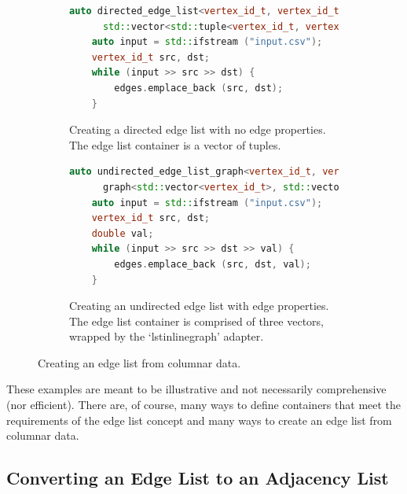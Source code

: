 \begin{figure}[ht]
  \begin{center}
    \begin{subfigure}{0.48\textwidth}
      \begin{lstlisting}[language=C++]
    auto directed_edge_list<vertex_id_t, vertex_id_t>
      std::vector<std::tuple<vertex_id_t, vertex_id_t> edges;
    auto input = std::ifstream ("input.csv");
    vertex_id_t src, dst;
    while (input >> src >> dst) {
        edges.emplace_back (src, dst);
    }
      \end{lstlisting}
      \caption{Creating a directed edge list with no edge properties.
      The edge list container is a vector of tuples.
      \label{subfig:edge_list_no_properties}}
    \end{subfigure}
    \begin{subfigure}{0.48\textwidth}
      \begin{lstlisting}[language=C++]
    auto undirected_edge_list_graph<vertex_id_t, vertex_id_t, double>
      graph<std::vector<vertex_id_t>, std::vector<vertex_id_t>, std::vector<double>> edges;
    auto input = std::ifstream ("input.csv");
    vertex_id_t src, dst;
    double val;
    while (input >> src >> dst >> val) {
        edges.emplace_back (src, dst, val);
    }
      \end{lstlisting}
      \caption{Creating an undirected edge list with edge properties.
      The edge list container is comprised of three vectors, wrapped by
      the `lstinline{graph}' adapter.
      \label{subfig:edge_list_with_properties}}
    \end{subfigure}
    \caption{Creating an edge list from columnar data.\label{fig:edge_list_from_columnar_data}}
  \end{center}
\end{figure}

These examples are meant to be illustrative and not necessarily
comprehensive (nor efficient).
There are, of course, many ways to define containers that meet the
requirements of the edge list concept and many ways to
create an edge list from columnar data.

\subsection{Converting an Edge List to an Adjacency List}

